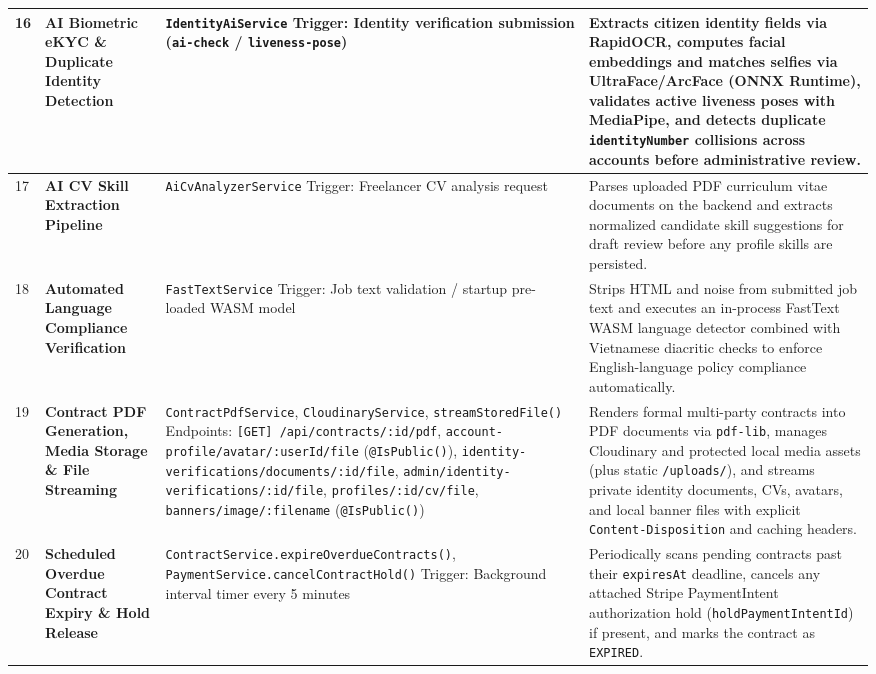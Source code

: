 \begin{longtable}{|C{0.7cm}|L{3.2cm}|S{5.4cm}|p{5.8cm}|}
16 &
\textbf{AI Biometric eKYC \& Duplicate Identity Detection} &
\texttt{IdentityAiService} \newline
Trigger: Identity verification submission (\texttt{ai-check} / \texttt{liveness-pose}) &
Extracts citizen identity fields via RapidOCR, computes facial embeddings and matches selfies via UltraFace/ArcFace (ONNX Runtime), validates active liveness poses with MediaPipe, and detects duplicate \texttt{identityNumber} collisions across accounts before administrative review.
\\ \hline

17 &
\textbf{AI CV Skill Extraction Pipeline} &
\texttt{AiCvAnalyzerService} \newline
Trigger: Freelancer CV analysis request &
Parses uploaded PDF curriculum vitae documents on the backend and extracts normalized candidate skill suggestions for draft review before any profile skills are persisted.
\\ \hline

18 &
\textbf{Automated Language Compliance Verification} &
\texttt{FastTextService} \newline
Trigger: Job text validation / startup pre-loaded WASM model &
Strips HTML and noise from submitted job text and executes an in-process FastText WASM language detector combined with Vietnamese diacritic checks to enforce English-language policy compliance automatically.
\\ \hline

19 &
\textbf{Contract PDF Generation, Media Storage \& File Streaming} &
\texttt{ContractPdfService}, \texttt{CloudinaryService}, \texttt{streamStoredFile()} \newline
Endpoints: \texttt{[GET] /api/\allowbreak{}contracts/\allowbreak{}:id/\allowbreak{}pdf}, \texttt{account-profile/\allowbreak{}avatar/\allowbreak{}:userId/\allowbreak{}file} (\texttt{@IsPublic()}), \texttt{identity-verifications/\allowbreak{}documents/\allowbreak{}:id/\allowbreak{}file}, \texttt{admin/\allowbreak{}identity-verifications/\allowbreak{}:id/\allowbreak{}file}, \texttt{profiles/\allowbreak{}:id/\allowbreak{}cv/\allowbreak{}file}, \texttt{banners/\allowbreak{}image/\allowbreak{}:filename} (\texttt{@IsPublic()}) &
Renders formal multi-party contracts into PDF documents via \texttt{pdf-lib}, manages Cloudinary and protected local media assets (plus static \texttt{/uploads/}), and streams private identity documents, CVs, avatars, and local banner files with explicit \texttt{Content-Disposition} and caching headers.
\\ \hline

20 &
\textbf{Scheduled Overdue Contract Expiry \& Hold Release} &
\texttt{ContractService.\allowbreak{}expireOverdueContracts()}, \texttt{PaymentService.\allowbreak{}cancelContractHold()} \newline
Trigger: Background interval timer every 5 minutes &
Periodically scans pending contracts past their \texttt{expiresAt} deadline, cancels any attached Stripe PaymentIntent authorization hold (\texttt{holdPaymentIntentId}) if present, and marks the contract as \texttt{EXPIRED}.
\\ \hline

\end{longtable}
\endgroup
